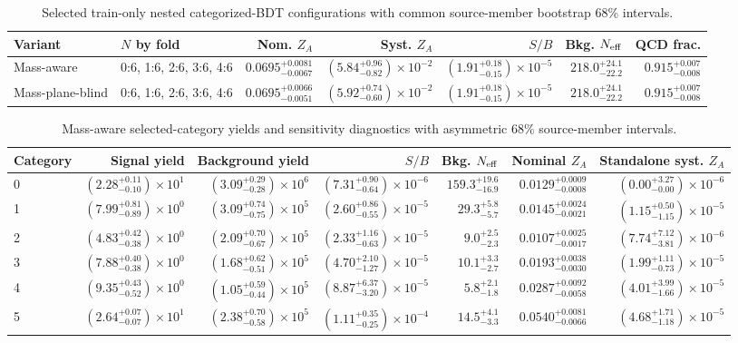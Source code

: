 \begin{table}[tb]
  \centering
  \footnotesize
  \caption{Selected train-only nested categorized-BDT configurations with common source-member bootstrap 68\% intervals.}
  \label{tab:c7w-selected}
  \begin{tabular}{llrrrrr}
    \toprule
    Variant & $N$ by fold & Nom. $Z_A$ & Syst. $Z_A$ & $S/B$ & Bkg. $N_{\rm eff}$ & QCD frac. \\
    \midrule
    Mass-aware & 0:6, 1:6, 2:6, 3:6, 4:6 & $0.0695^{+0.0081}_{-0.0067}$ & $(5.84^{+0.96}_{-0.82})\times10^{-2}$ & $(1.91^{+0.18}_{-0.15})\times10^{-5}$ & $218.0^{+24.1}_{-22.2}$ & $0.915^{+0.007}_{-0.008}$ \\
    Mass-plane-blind & 0:6, 1:6, 2:6, 3:6, 4:6 & $0.0695^{+0.0066}_{-0.0051}$ & $(5.92^{+0.74}_{-0.60})\times10^{-2}$ & $(1.91^{+0.18}_{-0.15})\times10^{-5}$ & $218.0^{+24.1}_{-22.2}$ & $0.915^{+0.007}_{-0.008}$ \\
    \bottomrule
  \end{tabular}
\end{table}
\begin{table}[tb]
  \centering
  \footnotesize
  \caption{Mass-aware selected-category yields and sensitivity diagnostics with asymmetric 68\% source-member intervals.}
  \label{tab:c7w-categories}
  \begin{tabular}{lrrrrrr}
    \toprule
    Category & Signal yield & Background yield & $S/B$ & Bkg. $N_{\rm eff}$ & Nominal $Z_A$ & Standalone syst. $Z_A$ \\
    \midrule
    0 & $(2.28^{+0.11}_{-0.10})\times10^{1}$ & $(3.09^{+0.29}_{-0.28})\times10^{6}$ & $(7.31^{+0.90}_{-0.64})\times10^{-6}$ & $159.3^{+19.6}_{-16.9}$ & $0.0129^{+0.0009}_{-0.0008}$ & $(0.00^{+3.27}_{-0.00})\times10^{-6}$ \\
    1 & $(7.99^{+0.81}_{-0.89})\times10^{0}$ & $(3.09^{+0.74}_{-0.75})\times10^{5}$ & $(2.60^{+0.86}_{-0.55})\times10^{-5}$ & $29.3^{+5.8}_{-5.7}$ & $0.0145^{+0.0024}_{-0.0021}$ & $(1.15^{+0.50}_{-1.15})\times10^{-5}$ \\
    2 & $(4.83^{+0.42}_{-0.38})\times10^{0}$ & $(2.09^{+0.70}_{-0.67})\times10^{5}$ & $(2.33^{+1.16}_{-0.63})\times10^{-5}$ & $9.0^{+2.5}_{-2.3}$ & $0.0107^{+0.0025}_{-0.0017}$ & $(7.74^{+7.12}_{-3.81})\times10^{-6}$ \\
    3 & $(7.88^{+0.40}_{-0.38})\times10^{0}$ & $(1.68^{+0.62}_{-0.51})\times10^{5}$ & $(4.70^{+2.10}_{-1.27})\times10^{-5}$ & $10.1^{+3.3}_{-2.7}$ & $0.0193^{+0.0038}_{-0.0030}$ & $(1.99^{+1.11}_{-0.73})\times10^{-5}$ \\
    4 & $(9.35^{+0.43}_{-0.52})\times10^{0}$ & $(1.05^{+0.59}_{-0.44})\times10^{5}$ & $(8.87^{+6.37}_{-3.20})\times10^{-5}$ & $5.8^{+2.1}_{-1.8}$ & $0.0287^{+0.0092}_{-0.0058}$ & $(4.01^{+3.99}_{-1.66})\times10^{-5}$ \\
    5 & $(2.64^{+0.07}_{-0.07})\times10^{1}$ & $(2.38^{+0.70}_{-0.58})\times10^{5}$ & $(1.11^{+0.35}_{-0.25})\times10^{-4}$ & $14.5^{+4.1}_{-3.3}$ & $0.0540^{+0.0081}_{-0.0066}$ & $(4.68^{+1.71}_{-1.18})\times10^{-5}$ \\
    \bottomrule
  \end{tabular}
\end{table}
